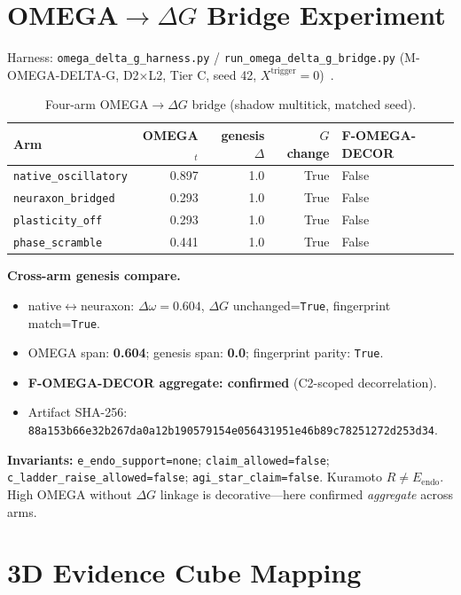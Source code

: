 \documentclass[11pt,a4paper]{article}
\theoremstyle{definition}
\begin{document}
\section{OMEGA$\to\Delta G$ Bridge Experiment}\label{sec:omega-delta-g}

Harness: \texttt{omega\_delta\_g\_harness.py} / \texttt{run\_omega\_delta\_g\_bridge.py} (M-OMEGA-DELTA-G, D2$\times$L2, Tier C, seed 42, $X^{\mathrm{trigger}}=0$)~\cite{kuznetsov2026omega_delta}.

\begin{table}[H]
\centering\small
\begin{tabular}{lrrrl}
\toprule Arm & OMEGA$_t$ & genesis $\Delta$ & $G$ change & F-OMEGA-DECOR \\ \midrule
\texttt{native\_oscillatory} & 0.897 & 1.0 & True & False \\
\texttt{neuraxon\_bridged} & 0.293 & 1.0 & True & False \\
\texttt{plasticity\_off} & 0.293 & 1.0 & True & False \\
\texttt{phase\_scramble} & 0.441 & 1.0 & True & False \\ \bottomrule
\end{tabular}
\caption{Four-arm OMEGA$\to\Delta G$ bridge (shadow multitick, matched seed).}
\label{tab:omega-delta-g}
\end{table}

\textbf{Cross-arm genesis compare.}
\begin{itemize}[leftmargin=*]
\item native$\leftrightarrow$neuraxon: $\Delta\omega=0.604$, $\Delta G$ unchanged=\texttt{True}, fingerprint match=\texttt{True}.
\item OMEGA span: \textbf{0.604}; genesis span: \textbf{0.0}; fingerprint parity: \texttt{True}.
\item \textbf{F-OMEGA-DECOR aggregate: confirmed} (C2-scoped decorrelation).
\item Artifact SHA-256: \texttt{88a153b66e32b267da0a12b190579154e056431951e46b89c78251272d253d34}.
\end{itemize}

\textbf{Invariants:} \texttt{e\_endo\_support=none}; \texttt{claim\_allowed=false}; \texttt{c\_ladder\_raise\_allowed=false}; \texttt{agi\_star\_claim=false}. Kuramoto $R \neq E_{\mathrm{endo}}$. High OMEGA without $\Delta G$ linkage is decorative---here confirmed \emph{aggregate} across arms.

\section{3D Evidence Cube Mapping}\label{sec:cube}
\end{document}
